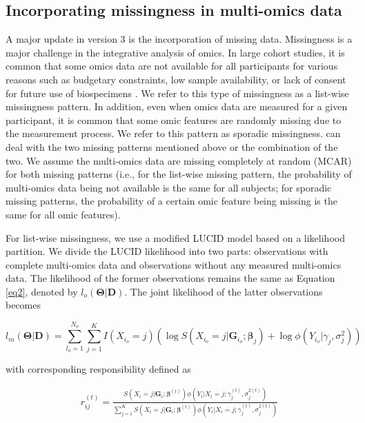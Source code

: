 \subsection{Incorporating missingness in multi-omics data}

A major update in  version 3 is the incorporation of missing data. Missingness is a major challenge in the integrative analysis of omics. In large cohort studies, it is common that some omics data are not available for all participants for various reasons such as budgetary constraints, low sample availability, or lack of consent for future use of biospecimens \citep{voillet2016handling}. We refer to this type of missingness as a list-wise missingness pattern. In addition, even when omics data are measured for a given participant, it is common that some omic features are randomly missing due to the measurement process. We refer to this pattern as sporadic missingness.  can deal with the two missing patterns mentioned above or the combination of the two. We assume the multi-omics data are missing completely at random (MCAR) for both missing patterns (i.e., for the list-wise missing pattern, the probability of multi-omics data being not available is the same for all subjects; for sporadic missing patterns, the probability of a certain omic feature being missing is the same for all omic features).

For list-wise missingness, we use a modified LUCID model based on a likelihood partition. We divide the LUCID likelihood into two parts: observations with complete multi-omics data and observations without any measured multi-omics data. The likelihood of the former observations remains the same as Equation \ref{eq2}, denoted by $l_o (\bm{\Theta}|\bm{D})$. The joint likelihood of the latter observations becomes

\begin{equation}
    l_m(\bm{\Theta}|\bm{D}) = \sum_{l_o=1}^{N_o}\sum_{j=1}^K I(X_{i_o} = j) \left( \log S(X_{i_o} = j| \bm{G}_{i_o};\bm{\beta}_j) + \log \phi\left(Y_{i_o}|\gamma_j, \sigma_j^2\right)\right)
    \label{eq22}
\end{equation}

with corresponding responsibility defined as

\begin{equation}
    \begin{aligned}
        r_{ij}^{(t)} = \frac{S\left(X_i = j| \bm{G}_i; \bm{\beta}^{(t)}\right) \phi\left(Y_i|X_i = j; \gamma_j^{(t)}, \sigma^{2(t)}_j \right)}{\sum_{j = 1}^K S\left(X_i = j| \bm{G}_i; \bm{\beta}^{(t)}\right) \phi \left(Y_i|X_i = j; \gamma_j^{(t)}, \sigma^{2(t)}_j\right)}
    \end{aligned}
    \label{eq23}
\end{equation}

